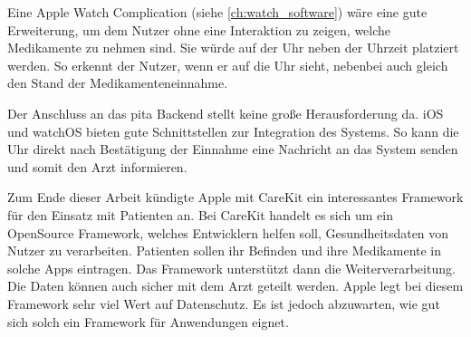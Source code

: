 Eine Apple Watch Complication (siehe \ref{ch:watch_software}) wäre eine gute Erweiterung, um dem Nutzer ohne eine Interaktion zu zeigen, welche Medikamente zu nehmen sind. Sie würde auf der Uhr neben der Uhrzeit platziert werden. So erkennt der Nutzer, wenn er auf die Uhr sieht, nebenbei auch gleich den Stand der Medikamenteneinnahme.

Der Anschluss an das \gls{pita} Backend stellt keine große Herausforderung da. iOS und watchOS bieten gute Schnittstellen zur Integration des Systems. So kann die Uhr direkt nach Bestätigung der Einnahme eine Nachricht an das System senden und somit den Arzt informieren.

Zum Ende dieser Arbeit kündigte Apple mit CareKit \cite{Apple:2016:careKit} ein interessantes Framework für den Einsatz mit Patienten an. Bei CareKit handelt es sich um ein OpenSource Framework, welches Entwicklern helfen soll, Gesundheitsdaten von Nutzer zu verarbeiten. Patienten sollen ihr Befinden und ihre Medikamente in solche Apps eintragen. Das Framework unterstützt dann die Weiterverarbeitung. Die Daten können auch sicher mit dem Arzt geteilt werden. Apple legt bei diesem Framework sehr viel Wert auf Datenschutz. Es ist jedoch abzuwarten, wie gut sich solch ein Framework für Anwendungen eignet.

